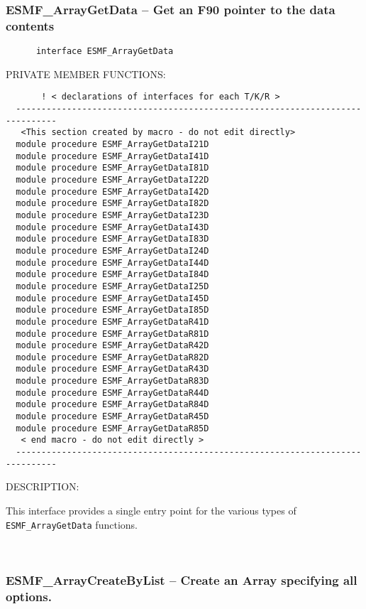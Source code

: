\subsubsection [ESMF\_ArrayGetData] {ESMF\_ArrayGetData -- Get an F90 pointer to the data contents}


\begin{verbatim}      interface ESMF_ArrayGetData\end{verbatim}{\sf PRIVATE MEMBER FUNCTIONS:}
\begin{verbatim}       ! < declarations of interfaces for each T/K/R >
  ------------------------------------------------------------------------------ 
   <This section created by macro - do not edit directly> 
  module procedure ESMF_ArrayGetDataI21D 
  module procedure ESMF_ArrayGetDataI41D 
  module procedure ESMF_ArrayGetDataI81D 
  module procedure ESMF_ArrayGetDataI22D 
  module procedure ESMF_ArrayGetDataI42D 
  module procedure ESMF_ArrayGetDataI82D 
  module procedure ESMF_ArrayGetDataI23D 
  module procedure ESMF_ArrayGetDataI43D 
  module procedure ESMF_ArrayGetDataI83D 
  module procedure ESMF_ArrayGetDataI24D 
  module procedure ESMF_ArrayGetDataI44D 
  module procedure ESMF_ArrayGetDataI84D 
  module procedure ESMF_ArrayGetDataI25D 
  module procedure ESMF_ArrayGetDataI45D 
  module procedure ESMF_ArrayGetDataI85D 
  module procedure ESMF_ArrayGetDataR41D 
  module procedure ESMF_ArrayGetDataR81D 
  module procedure ESMF_ArrayGetDataR42D 
  module procedure ESMF_ArrayGetDataR82D 
  module procedure ESMF_ArrayGetDataR43D 
  module procedure ESMF_ArrayGetDataR83D 
  module procedure ESMF_ArrayGetDataR44D 
  module procedure ESMF_ArrayGetDataR84D 
  module procedure ESMF_ArrayGetDataR45D 
  module procedure ESMF_ArrayGetDataR85D 
   < end macro - do not edit directly > 
  ------------------------------------------------------------------------------ 
 \end{verbatim}
{\sf DESCRIPTION:\\ }


   This interface provides a single entry point for the various
   types of {\tt ESMF\_ArrayGetData} functions.
   
 
\mbox{}\hrulefill\ 
 
\subsubsection [ESMF\_ArrayCreateByList] {ESMF\_ArrayCreateByList -- Create an Array specifying all options.}


